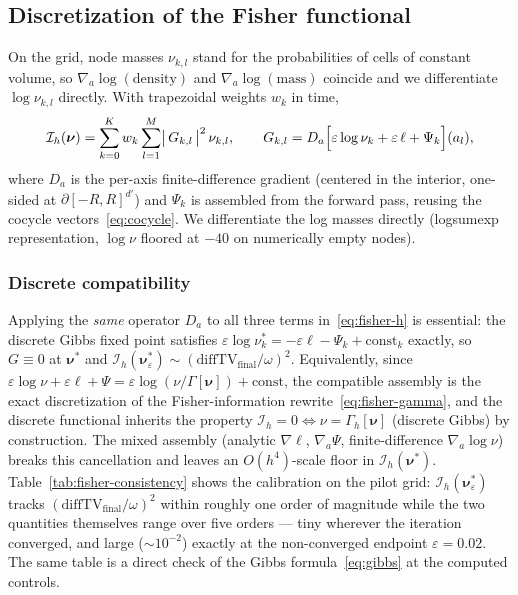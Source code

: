 \documentclass[11pt,leqno]{amsart}
\newcommand{\cI}{\mathcal{I}}
\newcommand{\bnu}{\boldsymbol{\nu}}
\newcommand{\eps}{\varepsilon}
\numberwithin{equation}{section}
\theoremstyle{definition}
\begin{document}
\subsection{Discretization of the Fisher functional}
\label{sec:method-fisher}

On the grid, node masses $\nu_{k,l}$ stand for the probabilities of cells of
constant volume, so $\nabla_a\log(\text{density})$ and
$\nabla_a\log(\text{mass})$ coincide and we differentiate $\log\nu_{k,l}$
directly.  With trapezoidal weights $w_k$ in time,
\begin{equation}
\label{eq:fisher-h}
\cI_h(\bnu)=\sum_{k=0}^{K}w_k\sum_{l=1}^{M}
\bigl|\,G_{k,l}\,\bigr|^2\,\nu_{k,l},
\qquad
G_{k,l}= D_a\Bigl[\eps\log\nu_{k}+\eps\,\ell+\Psi_{k}\Bigr](a_l),
\end{equation}
where $D_a$ is the per-axis finite-difference gradient (centered in the
interior, one-sided at $\partial[-R,R]^{d'}$) and $\Psi_k$ is assembled
from the forward pass, reusing the cocycle vectors~\eqref{eq:cocycle}.  We
differentiate the log masses directly (logsumexp representation, $\log\nu$
floored at $-40$ on numerically empty nodes).

\subsubsection*{Discrete compatibility}
Applying the \emph{same} operator $D_a$ to all three terms
in~\eqref{eq:fisher-h} is essential: the discrete Gibbs fixed point
satisfies $\eps\log\nu^*_k=-\eps\ell-\Psi_k+\mathrm{const}_k$ exactly, so
$G\equiv0$ at $\bnu^*$ and
$\cI_h(\bnu^*_\eps)\sim(\mathrm{diffTV}_{\mathrm{final}}/\omega)^2$.
Equivalently, since
$\eps\log\nu+\eps\ell+\Psi=\eps\log(\nu/\Gamma[\bnu])+\mathrm{const}$, the
compatible assembly is the exact discretization of the Fisher-information
rewrite~\eqref{eq:fisher-gamma}, and the discrete functional inherits the
property $\cI_h=0\Leftrightarrow\nu=\Gamma_h[\bnu]$ (discrete Gibbs) by
construction.  The mixed assembly (analytic $\nabla\ell$, $\nabla_a\Psi$, finite-difference
$\nabla_a\log\nu$) breaks this cancellation and leaves an $O(h^4)$-scale
floor in $\cI_h(\bnu^*)$.
Table~\ref{tab:fisher-consistency} shows the calibration on the pilot grid:
$\cI_h(\bnu^*_\eps)$ tracks $(\mathrm{diffTV}_{\mathrm{final}}/\omega)^2$
within roughly one order of magnitude while the two quantities themselves
range over five orders --- tiny wherever the iteration converged, and large
($\sim10^{-2}$) exactly at the non-converged endpoint $\eps=0.02$.  The same
table is a direct check of the Gibbs formula~\eqref{eq:gibbs} at the
computed controls.
\end{document}
